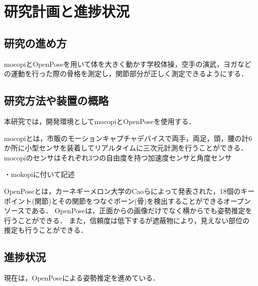\documentclass[titlepage]{jarticle}
\begin{document}
%
%
%
%
%

%
%
%
%
\section{研究計画と進捗状況}
%

%
%
\subsection{研究の進め方}
%
mocopiとOpenPoseを用いて体を大きく動かす学校体操，空手の演武，ヨガなどの運動を行った際の骨格を測定し，関節部分が正しく測定できるようにする．
%
%
%
\subsection{研究方法や装置の概略}
%
本研究では，開発環境としてmocopiとOpenPoseを使用する．

mocopi\cite{mocopi}とは，市販のモーションキャプチャデバイスで両手，両足，頭，腰の計6か所に小型センサを装着してリアルタイムに三次元計測を行うことができる．
mocopiのセンサはそれぞれ3つの自由度を持つ加速度センサと角度センサ

・mokopiに付いて記述


OpenPose\cite{openpose}とは，カーネギーメロン大学のCaoらによって発表された，18個のキーポイント(関節)とその関節をつなぐボーン(骨)を検出することができるオープンソースである．
OpenPoseは，正面からの画像だけでなく横からでも姿勢推定を行うことができる．
また，信頼度は低下するが遮蔽物により，見えない部位の推定も行うことができる．
%

%
%
%
\subsection{進捗状況}
%
現在は，OpenPoseによる姿勢推定を進めている．
%
%
%
\end{document}
